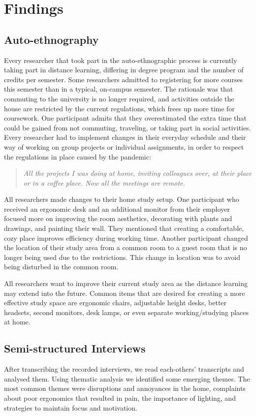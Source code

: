 \documentclass{sigchi}
\begin{document}
\section{Findings}

\subsection{Auto-ethnography}
Every researcher that took part in the auto-ethnographic process is currently taking part in distance learning, differing in degree program and the number of credits per semester. Some researchers admitted to registering for more courses this semester than in a typical, on-campus semester. The rationale was that commuting to the university is no longer required, and activities outside the house are restricted by the current regulations, which frees up more time for coursework. One participant admits that they overestimated the extra time that could be gained from not commuting, traveling, or taking part in social activities. Every researcher had to implement changes in their everyday schedule and their way of working on group projects or individual assignments, in order to respect the regulations in place caused by the pandemic:

\begin{quote}
\emph{All the projects I was doing at home, inviting colleagues over, at their place or in a coffee place. Now all the meetings are remote.}
\end{quote}

All researchers made changes to their home study setup. One participant who received an ergonomic desk and an additional monitor from their employer focused more on improving the room aesthetics, decorating with plants and drawings, and painting their wall. They mentioned that creating a comfortable, cozy place improves efficiency during working time. Another participant changed the location of their study area from a common room to a guest room that is no longer being used due to the restrictions. This change in location was to avoid being disturbed in the common room. 

All researchers want to improve their current study area as the distance learning may extend into the future. Common items that are desired for creating a more effective study space are ergonomic chairs, adjustable height desks, better headsets, second monitors, desk lamps, or even separate working/studying places at home. 

\subsection{Semi-structured Interviews}
After transcribing the recorded interviews, we read each-others' transcripts and analysed them. Using thematic analysis we identified some emerging themes. The most common themes were disruptions and annoyances in the home, complaints about poor ergonomics that resulted in pain, the importance of lighting, and strategies to maintain focus and motivation.
\end{document}
